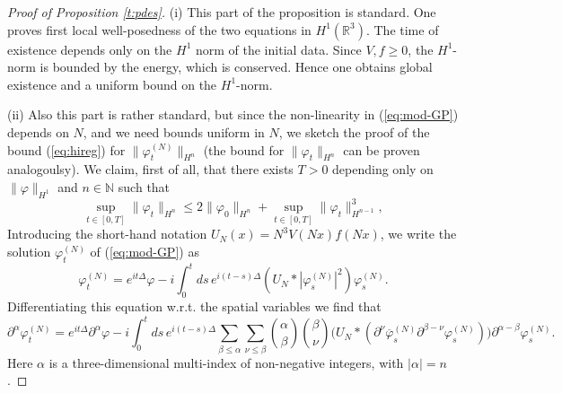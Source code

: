 \documentclass[11pt,a4paper]{article}
\newcommand{\bR}{{\mathbb R}}
\newcommand{\bN}{{\mathbb N}}
\newcommand{\cE}{{\cal E}}
\newcommand{\ph}{\varphi_t^{(N)}}	%
\begin{document}
\begin{proof}[Proof of Proposition \ref{t:pdes}] 
(i) This part of the proposition is standard. One proves first local well-posedness of the two equations in $H^1 (\bR^3)$. The time of existence depends only on the $H^1$ norm of the initial data. Since $V,f \geq 0$, the $H^1$-norm is bounded by the energy, which is conserved.  
Hence one obtains global existence and a uniform bound on the $H^1$-norm. 

(ii) Also this part is rather standard, but since the non-linearity in (\ref{eq:mod-GP}) depends on $N$, and we need bounds uniform in $N$, we sketch the proof of the bound (\ref{eq:hireg}) for $\| \varphi_t^{(N)} \|_{H^n}$ (the bound for $\| \varphi_t \|_{H^n}$ can be proven analogoulsy). We claim, first of all, that there exists $T>0$ depending only on $\| \varphi \|_{H^1}$ and $n \in \bN$ such that
  \begin{equation}\label{eq:preregularity}
    \sup_{t \in [0,T]} \| \varphi_t \|_{H^n} \le 2 \| \varphi_0 \|_{H^n} +
    \sup_{t \in [0,T]} \| \varphi_t \|_{H^{n-1}}^3,
 \end{equation}
 Introducing the short-hand notation $U_N (x)= N^3 V(Nx)f(Nx)$, we write the solution 
$\varphi_t^{(N)}$ of (\ref{eq:mod-GP}) as
\[
\varphi^{(N)}_t = e^{it\Delta} \varphi - i \int_0^t ds \, e^{i(t-s)\Delta} (U_N *
|\varphi^{(N)}_s|^2) \varphi^{(N)}_s.\]
Differentiating this equation w.r.t. the spatial variables we find that
\[
    \partial^\alpha \varphi^{(N)}_t = e^{it \Delta} \partial^\alpha \varphi - i
    \int_0^t ds \, e^{i(t-s) \Delta} \sum_{\beta \le \alpha} \sum_{\nu \le
    \beta} \binom{\alpha}{\beta} \binom{\beta}{\nu} \big( U_N * (\partial^\nu
    \overline{\varphi}^{(N)}_s \partial^{\beta - \nu} \varphi^{(N)}_s) \big)
    \partial^{\alpha - \beta} \varphi^{(N)}_s. \]
Here $\alpha$ is a three-dimensional multi-index of non-negative integers, with $|\alpha| = n$.
  

\end{proof}
\end{document}
